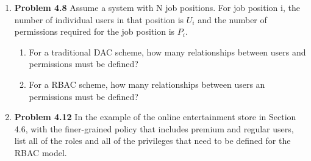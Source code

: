 \documentclass[12pt]{article}
\begin{document}
\begin{enumerate}
\item \textbf{Problem 4.8} Assume a system with N job positions. For job position i, the number of individual users in that position is $U_{i}$ and the number of permissions required for the job position is $P_i$.
  \begin{enumerate}
    \item For a traditional DAC scheme, how many relationships between users and permissions must be defined? \\

    \item For a RBAC scheme, how many relationships between users an permissions must be defined? \\
  \end{enumerate}

\item \textbf{Problem 4.12} In the example of the online entertainment store in Section 4.6, with the finer-grained policy that includes premium and regular users, list all of the roles and all of the privileges that need to be defined for the RBAC model.

\end{enumerate}
\end{document}
